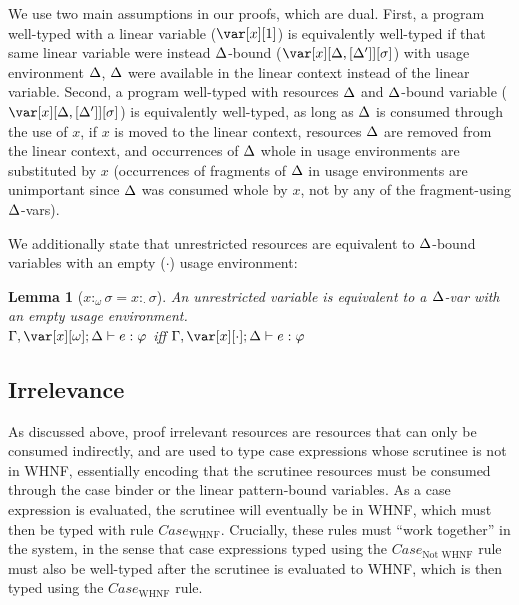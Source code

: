 \documentclass[acmsmall,review]{acmart}
\newtheorem{lemma}{Lemma}%
\begin{document}
\renewcommand{\DeltaUnrestrictedRelationLemma}{
\begin{lemma}[$x{:}_\omega\sigma = x{:}_{\cdot}\sigma$]
An unrestricted variable is equivalent to a $\D$-var with an empty usage environment.\\
$\G,\xo; \D \vdash e : \vp$ iff $\G,\x[\cdot]; \D \vdash e : \vp$
\end{lemma}
}

We use two main assumptions in our proofs, which are dual.
%
First, a program well-typed with a linear variable ($\xl$) is equivalently
well-typed if that same linear variable were instead $\Delta$-bound ($\xD$) with
usage environment $\Delta$, $\Delta$ were available in the linear context instead of
the linear variable.
%
%
\LinearDeltaRelationLemma
%
\noindent Second, a program well-typed with resources $\Delta$ and $\Delta$-bound
variable ($\xD$) is equivalently well-typed, as long as $\Delta$ is consumed
through the use of $x$, if $x$ is moved to the linear context, resources $\Delta$
are removed from the linear context, and occurrences of $\Delta$ whole in usage
environments are substituted by $x$ (occurrences of fragments of $\Delta$ in usage
environments are unimportant since $\Delta$ was consumed whole by $x$, not by any
of the fragment-using $\Delta$-vars).

\DeltaLinearRelationLemma


We additionally state that unrestricted resources are equivalent to $\Delta$-bound
variables with an empty ($\cdot$) usage environment:

\DeltaUnrestrictedRelationLemma

\subsection{Irrelevance}

As discussed above, proof irrelevant resources are resources that can only be
consumed indirectly, and are used to type case expressions whose scrutinee is
not in WHNF, essentially encoding that the scrutinee resources must be consumed
through the case binder or the linear pattern-bound variables.
%
As a case expression is evaluated, the scrutinee will eventually be in WHNF,
which must then be typed with rule $Case_{\textrm{WHNF}}$.
%
Crucially, these rules must ``work together'' in the system, in the sense that
case expressions typed using the $Case_{\textrm{Not WHNF}}$ rule must also be
well-typed after the scrutinee is evaluated to WHNF, which is then typed using
the $Case_{\textrm{WHNF}}$ rule.
\end{document}
